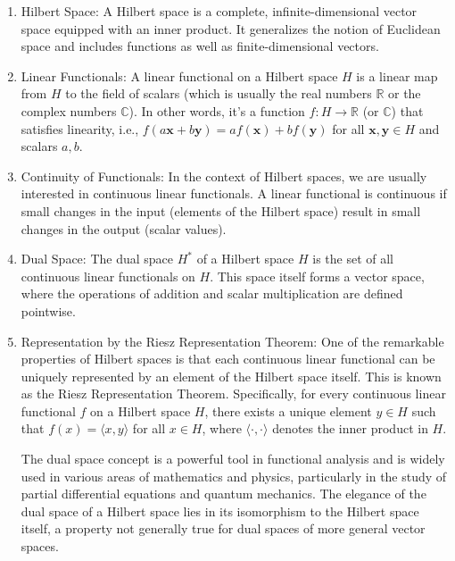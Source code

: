 \documentclass[a4paper,12pt]{article} %
\begin{document}
\begin{enumerate}
   \item Hilbert Space: A Hilbert space is a complete, infinite-dimensional vector space equipped with an inner product. It generalizes the notion of Euclidean space and includes functions as well as finite-dimensional vectors.

   \item Linear Functionals: A linear functional on a Hilbert space \( H \) is a linear map from \( H \) to the field of scalars (which is usually the real numbers \( \mathbb{R} \) or the complex numbers \( \mathbb{C} \)). In other words, it's a function \( f: H \rightarrow \mathbb{R} \) (or \( \mathbb{C} \)) that satisfies linearity, i.e., \( f(a\mathbf{x} + b\mathbf{y}) = af(\mathbf{x}) + bf(\mathbf{y}) \) for all \( \mathbf{x}, \mathbf{y} \in H \) and scalars \( a, b \).

   \item Continuity of Functionals: In the context of Hilbert spaces, we are usually interested in continuous linear functionals. A linear functional is continuous if small changes in the input (elements of the Hilbert space) result in small changes in the output (scalar values).

   \item Dual Space: The dual space \( H^* \) of a Hilbert space \( H \) is the set of all continuous linear functionals on \( H \). This space itself forms a vector space, where the operations of addition and scalar multiplication are defined pointwise.

   \item Representation by the Riesz Representation Theorem: One of the remarkable properties of Hilbert spaces is that each continuous linear functional can be uniquely represented by an element of the Hilbert space itself. This is known as the Riesz Representation Theorem. Specifically, for every continuous linear functional \( f \) on a Hilbert space \( H \), there exists a unique element \( y \in H \) such that \( f(x) = \langle x, y \rangle \) for all \( x \in H \), where \( \langle \cdot, \cdot \rangle \) denotes the inner product in \( H \).

The dual space concept is a powerful tool in functional analysis and is widely used in various areas of mathematics and physics, particularly in the study of partial differential equations and quantum mechanics. The elegance of the dual space of a Hilbert space lies in its isomorphism to the Hilbert space itself, a property not generally true for dual spaces of more general vector spaces.
\end{enumerate}
\end{document}
